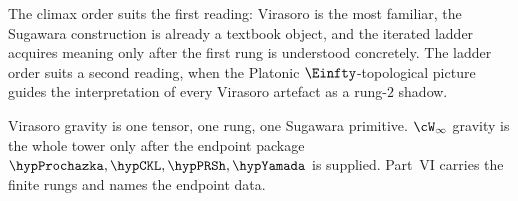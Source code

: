 The climax order suits the first reading: Virasoro is the most
familiar, the Sugawara construction is already a textbook object,
and the iterated ladder acquires meaning only after the first rung
is understood concretely. The ladder order suits a second reading,
when the Platonic $\Einfty$-topological picture guides the
interpretation of every Virasoro artefact as a rung-$2$ shadow.

\medskip

Virasoro gravity is one tensor, one rung, one Sugawara primitive.
\(\cW_\infty\) gravity is the whole tower only after the endpoint package
\(\hypProchazka,\hypCKL,\hypPRSh,\hypYamada\) is supplied. Part~VI carries
the finite rungs and names the endpoint data.
